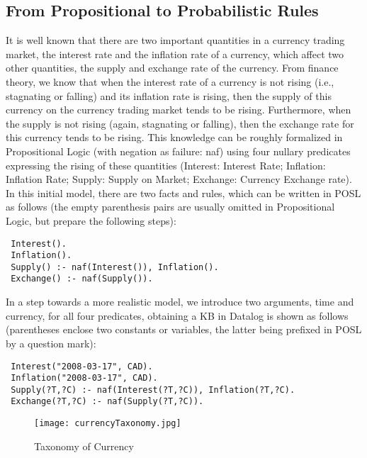 \documentclass [letterpaper] {Article}
\begin{document}
\begin{small}
\section{From Propositional to Probabilistic Rules}
\hspace{0.3in}It is well known that there are two important quantities in a currency trading market, the interest rate and the inflation rate of a currency, which affect two other quantities, the supply and exchange rate of the currency. From finance theory, we know that when the interest rate of a currency is not rising (i.e., stagnating or falling) and its inflation rate is rising, then the supply of this currency on the currency trading market tends to be rising. Furthermore, when the supply is not rising (again, stagnating or falling), then the exchange rate for this currency tends to be rising. This knowledge can be roughly formalized in Propositional Logic (with negation as failure: naf) using four nullary predicates expressing the rising of these quantities (Interest: Interest Rate; Inflation: Inflation Rate; Supply: Supply on Market; Exchange: Currency Exchange rate). In this initial model, there are two facts and rules, which can be written in POSL as follows (the empty parenthesis pairs are usually omitted in Propositional Logic, but prepare the following steps):

\begin{small}
\singlespacing
\begin{verbatim}
 Interest().
 Inflation().
 Supply() :- naf(Interest()), Inflation().
 Exchange() :- naf(Supply()).
\end{verbatim}
\end{small}

\hspace{0.3in}In a step towards a more realistic model, we introduce two arguments, time and currency, for all four predicates, obtaining a KB in Datalog is shown as follows (parentheses enclose two constants or variables, the latter being prefixed in POSL by a question mark):

\begin{small}
\singlespacing
\begin{verbatim}
 Interest("2008-03-17", CAD).
 Inflation("2008-03-17", CAD).
 Supply(?T,?C) :- naf(Interest(?T,?C)), Inflation(?T,?C).
 Exchange(?T,?C) :- naf(Supply(?T,?C)).
\end{verbatim}
\end{small}

\begin{figure}
\begin{center}
\texttt{[image: currencyTaxonomy.jpg]}
\caption {Taxonomy of Currency}
\label{fig:2Fig1}
\end{center}
\end{figure}


\end{small}
\end{document}

